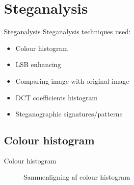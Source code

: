 \section{Steganalysis}
\begin{frame}{Steganalysis}{}
	Steganalysis techniques used:
	\begin{itemize}
		\item Colour histogram
		\item LSB enhancing
		\item Comparing image with original image
		\item DCT coefficients histogram
		\item Steganographic signatures/patterns
	\end{itemize}
\end{frame}

\subsection{Colour histogram}
\begin{frame}{Colour histogram}{}
\begin{figure}
\centering     %
{}
\caption{Sammenligning af colour histogram}
\label{fig:limits}
\end{figure}
\end{frame}

